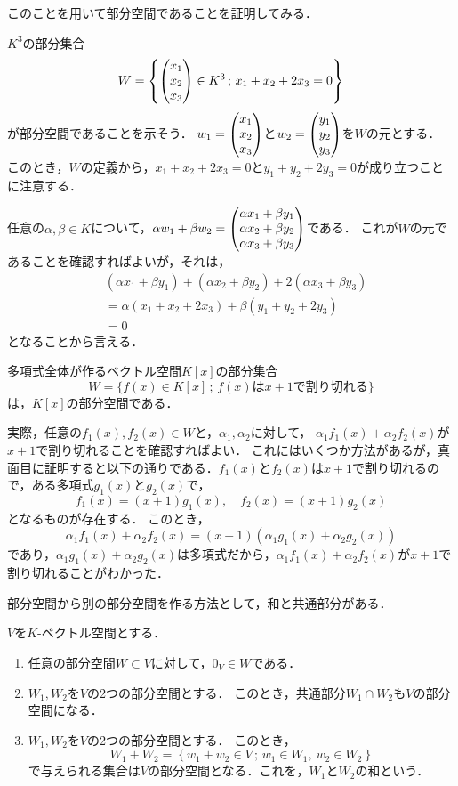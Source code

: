 このことを用いて部分空間であることを証明してみる．
\begin{example}
    $K^3$の部分集合
    \[
        W = \left\{ \begin{pmatrix} x_1 \\ x_2 \\ x_3 \end{pmatrix} \in K^3 \,;\, x_1 + x_2 + 2x_3 = 0\right\}
    \]
    が部分空間であることを示そう．
    $w_1 = \begin{pmatrix} x_1 \\ x_2 \\ x_3 \end{pmatrix}$と$w_2 = \begin{pmatrix} y_1 \\ y_2 \\ y_3 \end{pmatrix}$を$W$の元とする．
    このとき，$W$の定義から，$x_1 + x_2 + 2x_3 = 0$と$y_1 + y_2 + 2y_3 = 0$が成り立つことに注意する．
    
    任意の$\alpha,\beta\in K$について，$ \alpha w_1 + \beta w_2 = \begin{pmatrix} \alpha x_1 + \beta y_1 \\ \alpha x_2 + \beta y_2 \\ \alpha x_3 + \beta y_3 \end{pmatrix}$である．
    これが$W$の元であることを確認すればよいが，それは，
    \[
        \begin{aligned}
            &(\alpha x_1 + \beta y_1) + (\alpha x_2 + \beta y_2) + 2(\alpha x_3 + \beta y_3) \\
            &= \alpha (x_1 + x_2 + 2x_3) + \beta (y_1 + y_2 + 2y_3) \\
            &= 0
        \end{aligned}
    \]
    となることから言える．
\end{example}
\begin{example}
    多項式全体が作るベクトル空間$K[x]$の部分集合
    \[
        W = \{ f(x) \in K[x] \,;\, \mbox{$f(x)$は$x+1$で割り切れる} \}
    \]
    は，$K[x]$の部分空間である．
    
    実際，任意の$f_1(x),f_2(x) \in W$と，$\alpha_1,\alpha_2$に対して，
    $\alpha_1f_1(x) + \alpha_2 f_2(x)$が$x+1$で割り切れることを確認すればよい．
    これにはいくつか方法があるが，真面目に証明すると以下の通りである．$f_1(x)$と$f_2(x)$は$x+1$で割り切れるので，ある多項式$g_1(x)$と$g_2(x)$で，
    \[
        f_1(x) = (x+1)g_1(x),\quad f_2(x) = (x+1)g_2(x)
    \]
    となるものが存在する．
    このとき，
    \[
        \alpha_1f_1(x) + \alpha_2 f_2(x) = (x+1)(\alpha_1 g_1(x) + \alpha_2 g_2(x))
    \]
    であり，$\alpha_1 g_1(x) + \alpha_2 g_2(x)$は多項式だから，$\alpha_1f_1(x) + \alpha_2 f_2(x)$が$x+1$で割り切れることがわかった．
\end{example}
部分空間から別の部分空間を作る方法として，和と共通部分がある．
\begin{prop}\label{prop:sum_and_intersection}
    $V$を$K$-ベクトル空間とする．
    \begin{enumerate}
        \item 任意の部分空間$W \subset V$に対して，$0_V \in W$である．
        \item $W_1,W_2$を$V$の2つの部分空間とする．
        このとき，共通部分$W_1 \cap W_2$も$V$の部分空間になる．
        \item $W_1,W_2$を$V$の2つの部分空間とする．
        このとき，
        \[
            W_1 + W_2 = \left\{ w_1 + w_2 \in V \,;\, w_1 \in W_1,\ w_2 \in W_2 \right\}
        \]
        で与えられる集合は$V$の部分空間となる．これを，$W_1$と$W_2$の和という．
    \end{enumerate}
\end{prop}
